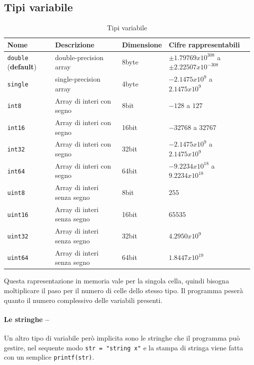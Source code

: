 \subsection{Tipi variabile}
\label{sec:tipivariabile}

\begin{table}[ht]
  \centering
  \begin{tabular}{llll}
    {\bf Nome} & {\bf Descrizione} & {\bf Dimensione} & {\bf Cifre rappresentabili}\\\hline
    \lstinline|double| ({\bf default}) & double-precision array & 8byte & $\pm1.79769x10^{308}$ a $\pm2.22507x10^{-308}$\\\hline
    \lstinline|single| & single-precision array & 4byte & $-2.1475x10^9$ a $2.1475x10^9$\\\hline 
    \lstinline|int8| & Array di interi con segno & 8bit & $-128$ a $127$\\\hline
    \lstinline|int16| & Array di interi con segno & 16bit & $-32768$ a $32767$ \\\hline
    \lstinline|int32| & Array di interi con segno & 32bit & $-2.1475x10^9$ a $2.1475x10^9$\\\hline 
    \lstinline|int64| & Array di interi con segno & 64bit & $-9.2234x10^{18}$ a $9.2234x10^{18}$\\\hline
    \lstinline|uint8| & Array di interi senza segno & 8bit & $255$\\\hline
    \lstinline|uint16| & Array di interi senza segno & 16bit & $65535$ \\\hline
    \lstinline|uint32| & Array di interi senza segno & 32bit & $4.2950x10^9$\\\hline 
    \lstinline|uint64| & Array di interi senza segno & 64bit & $1.8447x10^{19}$\\\hline
  \end{tabular}
  \caption{Tipi variabile}
  \label{tab:tipivariabile}
\end{table}
\begin{oss}
  Questa rapresentazione in memoria vale per la singola cella, quindi bisogna
  moltiplicare il paso per il numero di celle dello stesso tipo. Il programma
  peserà quanto il numero complessivo delle variabili presenti.
\end{oss}

\paragraph{Le stringhe --}
Un altro tipo di variabile però implicita sono le stringhe che il programma può
gestire, nel sequente modo \lstinline|str = "string x"| e la stampa di stringa
viene fatta con un semplice \lstinline|printf(str)|.
\clearpage
